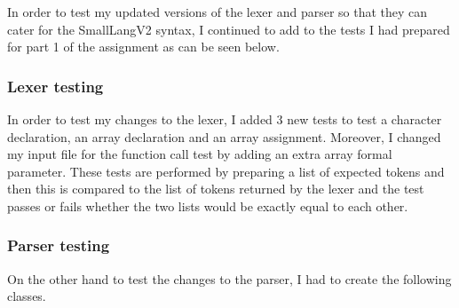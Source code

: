 \documentclass{article}
\begin{document}
				In order to test my updated versions of the lexer and parser so that they can cater for the SmallLangV2 syntax, I continued to add to the tests I had prepared for part 1 of the assignment as can be seen below.
				
				\subsubsection{Lexer testing}
				
				In order to test my changes to the lexer, I added 3 new tests to test a character declaration, an array declaration and an array assignment. Moreover, I changed my input file for the function call test by adding an extra array formal parameter. These tests are performed by preparing a list of expected tokens and then this is compared to the list of tokens returned by the lexer and the test passes or fails whether the two lists would be exactly equal to each other.
				
				\subsubsection{Parser testing}
				
				On the other hand to test the changes to the parser, I had to create the following classes.
				
\end{document}
